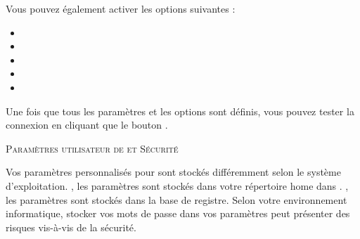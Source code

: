 Vous pouvez également activer les options suivantes :

\begin{itemize}[label=--]
\item {}
\item {}
\item {}
\item {}
\item {}
\end{itemize}

Une fois que tous les paramètres et les options sont définis, vous pouvez tester 
la connexion en cliquant que le bouton  .

\begin{Tip}\caption{\textsc{Paramètres utilisateur de \qg et Sécurité}}
Vos paramètres personnalisés pour \qg sont stockés différemment selon le 
système d'exploitation. \nix, les paramètres sont stockés dans votre répertoire 
home dans . \win, les paramètres sont stockés dans la base de 
registre. Selon votre environnement informatique, stocker vos mots de passe 
dans vos paramètres \qg peut présenter des risques vis-à-vis de la sécurité.
\end{Tip}

